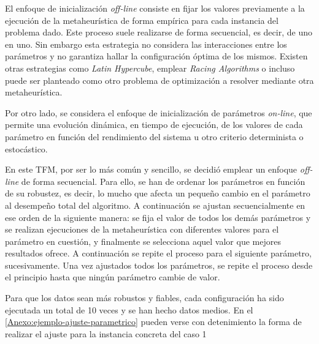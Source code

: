 El enfoque de inicialización \textit{off-line} consiste en fijar los valores previamente a la ejecución de la metaheurística de forma empírica para cada instancia del problema dado. Este proceso suele realizarse de forma secuencial, es decir, de uno en uno. Sin embargo esta estrategia no considera las interacciones entre los parámetros y no garantiza hallar la configuración óptima de los mismos. Existen otras estrategias como \textit{Latin Hypercube}, emplear \textit{Racing Algorithms} o incluso puede ser planteado como otro problema de optimización a resolver mediante otra metaheurística.

Por otro lado, se considera el enfoque de inicialización de parámetros \textit{on-line}, que permite una evolución dinámica, en tiempo de ejecución, de los valores de cada parámetro en función del rendimiento del sistema u otro criterio determinista o estocástico.

En este TFM, por ser lo más común y sencillo, se decidió emplear un enfoque \textit{off-line} de forma secuencial. Para ello, se han de ordenar los parámetros en función de su robustez, es decir, lo mucho que afecta un pequeño cambio en el parámetro al desempeño total del algoritmo. A continuación se ajustan secuencialmente en ese orden de la siguiente manera: se fija el valor de todos los demás parámetros y se realizan ejecuciones de la metaheurística con diferentes valores para el parámetro en cuestión, y finalmente se selecciona aquel valor que mejores resultados ofrece. A continuación se repite el proceso para el siguiente parámetro, sucesivamente.
Una vez ajustados todos los parámetros, se repite el proceso desde el principio hasta que ningún parámetro cambie de valor.

Para que los datos sean más robustos y fiables, cada configuración ha sido ejecutada un total de 10 veces y se han hecho datos medios. En el \autoref{Anexo:ejemplo-ajuste-parametrico} pueden verse con detenimiento la forma de realizar el ajuste para la instancia concreta del caso 1 %


